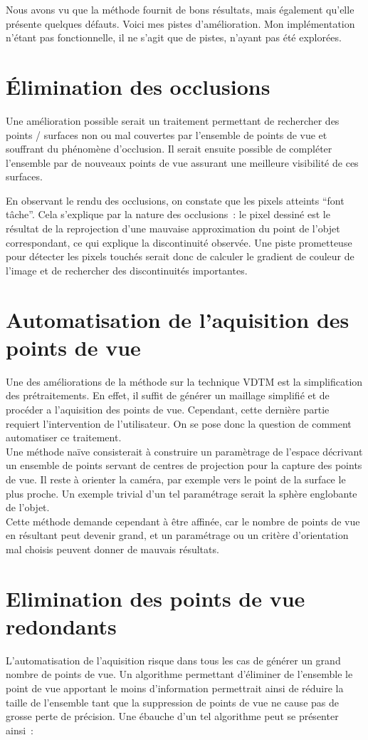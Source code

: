 Nous avons vu que la méthode fournit de bons résultats, mais également qu'elle présente quelques défauts. Voici mes pistes d'amélioration.
Mon implémentation n'étant pas fonctionnelle, il ne s'agit que de pistes, n'ayant pas été explorées.

\section{\'Elimination des occlusions}
Une amélioration possible serait un traitement permettant de rechercher des points / surfaces non ou mal couvertes par l'ensemble de points de vue
et souffrant du phénomène d'occlusion. Il serait ensuite possible de compléter l'ensemble par de nouveaux points de vue assurant une
meilleure visibilité de ces surfaces.

En observant le rendu des occlusions, on constate que les pixels atteints ``font t\^ache''. Cela s'explique par la nature des occlusions~:
le pixel dessiné est le résultat de la reprojection d'une mauvaise approximation du point de l'objet correspondant, ce qui explique la discontinuité observée.
Une piste prometteuse pour détecter les pixels touchés serait donc de calculer le gradient de couleur de l'image et de rechercher des discontinuités importantes.

\section{Automatisation de l'aquisition des points de vue}
Une des améliorations de la méthode sur la technique VDTM est la simplification des prétraitements. En effet, il
suffit de générer un maillage simplifié et de procéder a l'aquisition des points de vue. Cependant, cette dernière
partie requiert l'intervention de l'utilisateur. On se pose donc la question de comment automatiser ce traitement.\\
Une méthode naïve consisterait à construire un paramètrage de l'espace décrivant un ensemble de points servant de centres de projection
pour la capture des points de vue. Il reste à orienter la caméra, par exemple vers le point de la surface le plus proche. Un exemple trivial
d'un tel paramétrage serait la sphère englobante de l'objet.\\
Cette méthode demande cependant à être affinée, car le nombre de points de vue en résultant peut devenir grand, et un paramétrage ou un critère d'orientation
mal choisis peuvent donner de mauvais résultats.

\section{Elimination des points de vue redondants}
L'automatisation de l'aquisition risque dans tous les cas de générer un grand nombre de points de vue. Un algorithme
permettant d'éliminer de l'ensemble le point de vue apportant le moins d'information permettrait ainsi de réduire la taille
de l'ensemble tant que la suppression de points de vue ne cause pas de grosse perte de précision. Une ébauche d'un tel algorithme
peut se présenter ainsi~:

